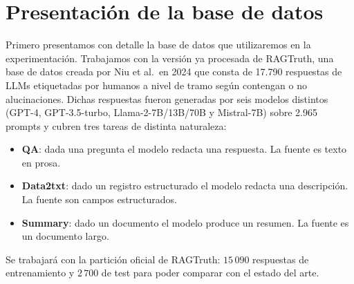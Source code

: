 \documentclass[12pt,a4paper]{report}
\theoremstyle{definition}
\begin{document}
\section{Presentación de la base de datos}

Primero presentamos con detalle la base de datos que utilizaremos en la experimentación. Trabajamos con la versión ya procesada de RAGTruth, una base de datos creada por Niu et al.\ en 2024 \cite{niu2024ragtruth} que consta de 17.790 respuestas de LLMs etiquetadas por humanos a nivel de tramo según contengan o no alucinaciones. Dichas respuestas fueron generadas por seis modelos distintos (GPT-4, GPT-3.5-turbo, Llama-2-7B/13B/70B y Mistral-7B) sobre 2.965 prompts y cubren tres tareas de distinta naturaleza:

\begin{itemize}
  \item \textbf{QA}: dada una pregunta el modelo redacta una respuesta. La fuente es texto en prosa.
  \item \textbf{Data2txt}: dado un registro estructurado el modelo redacta una descripción. La
        fuente son campos estructurados.
  \item \textbf{Summary}: dado un documento el
        modelo produce un resumen. La fuente es un documento largo.
\end{itemize}

Se trabajará con la partición oficial de RAGTruth: $15\,090$ respuestas de entrenamiento y
$2\,700$ de test para poder comparar con el estado del arte.
\end{document}

